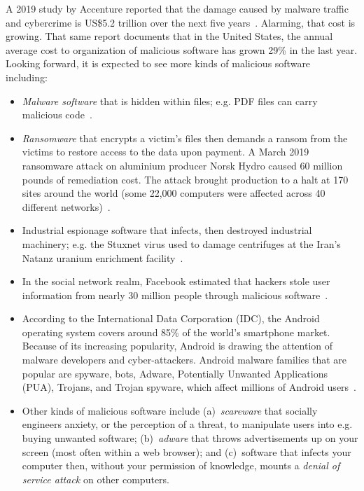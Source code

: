 \documentclass{NSF}
\newenvironment{myitemize}
{ \begin{itemize}[topsep=0pt,bottomsep=0pt,itemsep=0,leftmargin=*]
    \setlength{\itemsep}{0pt}
    \setlength{\parskip}{0pt}
    \setlength{\parsep}{0pt}     }
{ \end{itemize}                  }
\newcommand{\bi}{\begin{myitemize}}
\newcommand{\ei}{\end{myitemize}}
\newcommand{\tbl}[1]{Table~\ref{tbl:#1}}
\begin{document}
\begin{nsfdescription}
   
A 2019 study by Accenture reported that the damage caused by malware traffic and cybercrime is US\$5.2 trillion over the next five years~\cite{bissell2019cost}.
Alarming, that cost is growing. That same report documents that in the United States,  the annual average cost to organization of malicious software has grown 29\% in the last year. Looking forward, it is expected
to see more kinds of malicious software~\cite{bissell2019cost} including: 
\bi
\item
{\em Malware software} that is hidden within   files; e.g. PDF files can carry malicious code~\cite{smith01}.
\item
{\em Ransomware} that encrypts a victim's files then  demands a ransom from the victims to restore access to the data upon payment.
A March 2019 ransomware attack on aluminium producer Norsk Hydro caused 60 million pounds of remediation cost. The attack  brought production to a halt at 170 sites around the world (some 22,000 computers were affected across 40 different networks)~\cite{bissell2019cost}. 
\item
Industrial espionage software that infects, then destroyed  industrial machinery; e.g. the Stuxnet virus used to damage centrifuges at
the Iran’s Natanz uranium enrichment facility~\cite{langner2011stuxnet}.
\item
In the social network realm, Facebook estimated that hackers stole user information from nearly 30 million people through malicious software~\cite{facebookreport}.
\item
According to the International Data Corporation (IDC), the Android operating system covers around 85\% of the world’s smartphone market. Because of its increasing popularity, Android is drawing the attention of malware developers and cyber-attackers. Android malware families that are popular are spyware, bots, Adware, Potentially Unwanted Applications (PUA), Trojans, and Trojan spyware, which affect millions of Android users~\cite{bhat2019survey}.
\item
Other kinds of malicious software include
(a)~{\em scareware} that   socially engineers
anxiety, or the perception of a threat,  to manipulate users into e.g. buying unwanted software;
(b)~{\em adware} that throws advertisements up on your screen (most often within a web browser); and (c)~software that infects your computer then, without your permission of knowledge, mounts a {\em denial of service attack} on other computers. 
\ei


 

\end{nsfdescription}
\end{document}
